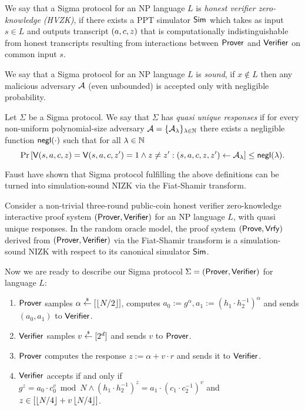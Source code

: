 \begin{definition}
We say that a Sigma protocol for an NP language  $L$ is \emph{honest verifier zero-knowledge (HVZK)}, if there exists a PPT simulator $\mathsf{Sim}$ which takes as input $s \in L$ and outputs transcript $(a,c,z)$ that is computationally indistinguishable from honest
transcripts resulting from interactions between $\mathsf{Prover}$ and $\mathsf{Verifier}$ on common input $s$.
\end{definition}

\begin{definition}[Soundness]
We say that a Sigma protocol for an NP language $L$ is \emph{sound}, if $x \notin L$ then any malicious adversary $\mathcal{A}$ (even unbounded) is accepted only with negligible probability.
\end{definition}

\begin{definition}
Let $\Sigma$ be a Sigma protocol. We say that $\Sigma$ has \emph{quasi unique responses} if for every non-uniform polynomial-size adversary $\mathcal{A} = \{\mathcal{A}_{\lambda}\}_{\lambda \in \mathbb{N}}$ there exists a negligible function $\mathsf{negl}(\cdot)$ such that for all $\lambda \in \mathbb{N}$ 
\[\Pr\left[ \mathsf{V}(s,a,c,z) = \mathsf{V}(s,a,c,z' ) = 1 \land z \neq z' : (s, a, c , z, z')\leftarrow \mathcal{A}_{\lambda} \right] \leq \mathsf{negl}(\lambda).\]
\end{definition}

Faust \etal \cite{INDOCRYPT:FKMV12} have shown that Sigma protocol fulfilling the above definitions can be turned into simulation-sound NIZK via the Fiat-Shamir transform. 

\begin{theorem}\label{thm:fs}
Consider a non-trivial three-round public-coin honest verifier zero-knowledge interactive proof system $(\mathsf{Prover}, \mathsf{Verifier})$ for an NP language $L$, with quasi unique responses. In the random oracle model, the proof system $(\mathsf{Prove}, \mathsf{Vrfy})$ derived from $(\mathsf{Prover}, \mathsf{Verifier})$ via the Fiat-Shamir transform is a simulation-sound NIZK with respect to its canonical simulator $\mathsf{Sim}$.
\end{theorem}

Now we are ready to describe our Sigma protocol $\Sigma = (\mathsf{Prover}, \mathsf{Verifier})$ for language $L$:
\begin{enumerate}
\item $\mathsf{Prover}$ samples $\alpha \stackrel{{\scriptscriptstyle\$}}{\leftarrow} [\left\lfloor N/2 \right\rfloor]$, computes $a_0:=g^\alpha, a_1:= (h_1\cdot h_2^{-1})^\alpha$ and sends $(a_0, a_1)$ to $\mathsf{Verifier}$.
\item $\mathsf{Verifier}$ samples $v \stackrel{{\scriptscriptstyle\$}}{\leftarrow} [2^d]$ and sends $v$ to $\mathsf{Prover}$.
\item $\mathsf{Prover}$ computes the response $z:= \alpha + v \cdot r$ and sends it to $\mathsf{Verifier}$.
\item $\mathsf{Verifier}$ accepts if and only if $g^z = a_0 \cdot c_0^v \bmod N \land (h_1\cdot h_2^{-1})^z = a_1 \cdot (c_1\cdot c_2^{-1})^v$ and $z \in [\left\lfloor N/4 \right\rfloor + v\left\lfloor N/4 \right\rfloor]$.
\end{enumerate}

